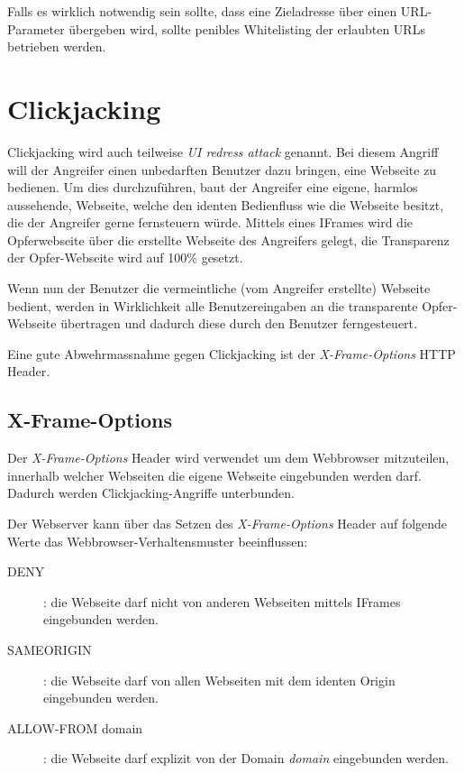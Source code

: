 Falls es wirklich notwendig sein sollte, dass eine Zieladresse über einen URL-Parameter übergeben wird, sollte penibles Whitelisting der erlaubten URLs betrieben werden.

\section{Clickjacking}

Clickjacking wird auch teilweise \textit{UI redress attack} genannt. Bei diesem Angriff will der Angreifer einen unbedarften Benutzer dazu bringen, eine Webseite zu bedienen. Um dies durchzuführen, baut der Angreifer eine eigene, harmlos aussehende, Webseite, welche den identen Bedienfluss wie die Webseite besitzt, die der Angreifer gerne fernsteuern würde. Mittels eines IFrames wird die Opferwebseite über die erstellte Webseite des Angreifers gelegt, die Transparenz der Opfer-Webseite wird auf 100\% gesetzt.

Wenn nun der Benutzer die vermeintliche (vom Angreifer erstellte) Webseite bedient, werden in Wirklichkeit alle Benutzereingaben an die transparente Opfer-Webseite übertragen und dadurch diese durch den Benutzer ferngesteuert.

Eine gute Abwehrmassnahme gegen Clickjacking ist der \textit{X-Frame-Options} HTTP Header.

\subsection{X-Frame-Options}
\label{x_frame_options}

Der \textit{X-Frame-Options} Header wird verwendet um dem Webbrowser mitzuteilen, innerhalb welcher Webseiten die eigene Webseite eingebunden werden darf. Dadurch werden Clickjacking-Angriffe unterbunden.

Der Webserver kann über das Setzen des \textit{X-Frame-Options} Header auf folgende Werte das Webbrowser-Verhaltensmuster beeinflussen:

\begin{description}
	\item[DENY]: die Webseite darf nicht von anderen Webseiten mittels IFrames eingebunden werden.
	\item[SAMEORIGIN]: die Webseite darf von allen Webseiten mit dem identen Origin eingebunden werden.
	\item[ALLOW-FROM domain]: die Webseite darf explizit von der Domain \textit{domain} eingebunden werden.
\end{description}

